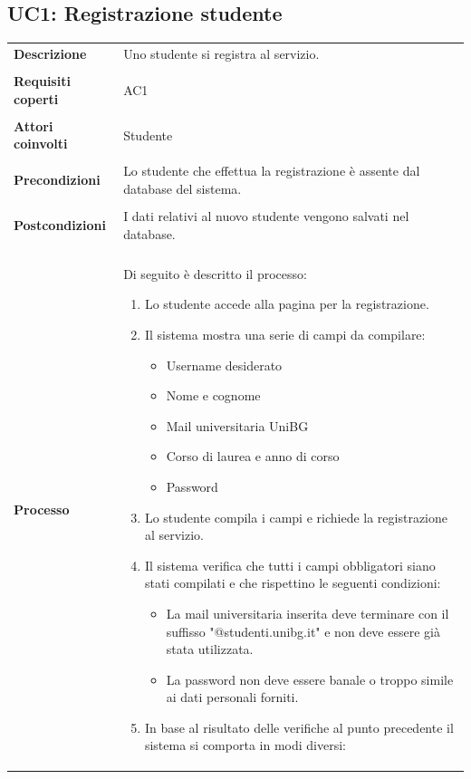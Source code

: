 \documentclass[10pt,a4paper]{article}
\begin{document}
	\subsection{UC1: Registrazione studente}
	\begin{tabular}{lp{}}
		\textbf{Descrizione}&Uno studente si registra al servizio.\\
		\\
		\textbf{Requisiti coperti}&AC1\\
		\\
		\textbf{Attori coinvolti}&Studente\\
		\\
		\textbf{Precondizioni}&Lo studente che effettua la registrazione è assente dal database del sistema.\\
		\\
		\textbf{Postcondizioni}&I dati relativi al nuovo studente vengono salvati nel database.\\
		\\
		\textbf{Processo}&Di seguito è descritto il processo:
		\begin{enumerate}
			\item Lo studente accede alla pagina per la registrazione.
			\item Il sistema mostra una serie di campi da compilare:
			\begin{itemize}
				\item Username desiderato
				\item Nome e cognome
				\item Mail universitaria UniBG
				\item Corso di laurea e anno di corso
				\item Password
			\end{itemize}
			\item Lo studente compila i campi e richiede la registrazione al servizio.
			\item Il sistema verifica che tutti i campi obbligatori siano stati compilati e che rispettino le seguenti condizioni:
			\begin{itemize}
				\item La mail universitaria inserita deve terminare con il suffisso "@studenti.unibg.it" e non deve essere già stata utilizzata.
				\item La password non deve essere banale o troppo simile ai dati personali forniti.
			\end{itemize}
			\item In base al risultato delle verifiche al punto precedente il sistema si comporta in modi diversi:

\end{enumerate}
\end{tabular}
\end{document}
